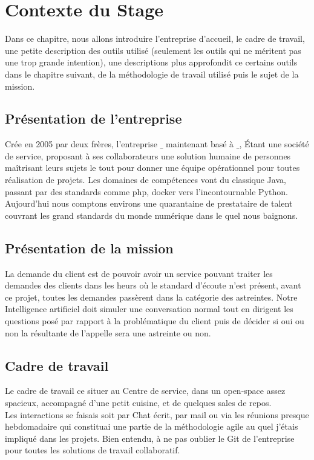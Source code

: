 
\chapter{Contexte du Stage}
Dans ce chapitre, nous allons introduire l'entreprise d'accueil, le cadre de travail, une petite description des outils utilisé (seulement les outils qui ne méritent pas une trop grande intention), une descriptions plus approfondit ce certains outils dans le chapitre suivant, de la méthodologie de travail utilisé puis le sujet de la mission.
\pagebreak

\section{Présentation de l'entreprise}
Crée en 2005 par deux frères, l'entreprise $\_$ maintenant basé à $\_$, Étant une société de service, proposant à ses collaborateurs une solution humaine de personnes maîtrisant leurs sujets le tout pour donner une équipe opérationnel pour toutes réalisation de projets.\linebreak
Les domaines de compétences vont du classique Java, passant par des standards comme php, docker vers l'incontournable Python. Aujourd'hui nous comptons environs une quarantaine de prestataire de talent couvrant les grand standards du monde numérique dans le quel nous baignons.\linebreak

\section{Présentation de la mission}
La demande du client est de pouvoir avoir un service pouvant traiter les demandes des clients dans les heurs où le standard d'écoute n'est présent, avant ce projet, toutes les demandes passèrent dans la catégorie des astreintes. Notre Intelligence artificiel doit simuler une conversation normal tout en dirigent les questions posé par rapport à la problématique du client puis de décider si oui ou non la résultante de l'appelle sera une astreinte ou non.
\pagebreak

\section{Cadre de travail}
Le cadre de travail ce situer au Centre de service, dans un open-space assez spacieux, accompagné d'une petit cuisine, et de quelques sales de repos.\\
Les interactions se faisais soit par Chat écrit, par mail ou via les réunions presque hebdomadaire qui constituai une partie de la méthodologie agile au quel j'étais impliqué dans les projets.
Bien entendu, à ne pas oublier le Git de l'entreprise pour toutes les solutions de travail collaboratif.

